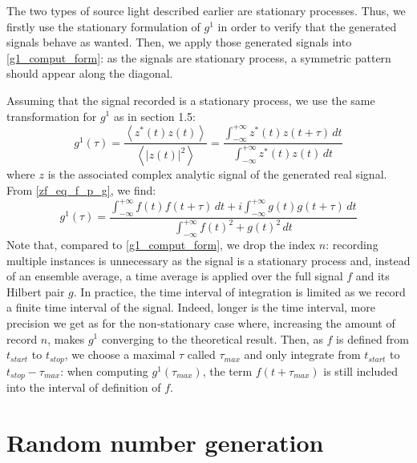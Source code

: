 \documentclass[10pt]{report}
\begin{document}
The two types of source light described earlier are stationary processes. Thus, we firstly use the stationary formulation of $g^1$ in order to verify that the generated signals behave as wanted. Then, we apply those generated signals into \eqref{g1_comput_form}: as the signals are stationary process, a symmetric pattern should appear along the diagonal.

Assuming that the signal recorded is a stationary process, we use the same transformation for $g^1$ as in section 1.5:
\begin{equation}
g^1(\tau) = \frac{\left\langle z^*(t)z(t) \right\rangle}{\left\langle \vert z(t) \vert ^2 \right\rangle} = \frac{\int_{-\infty}^{+\infty} z^*(t)z(t + \tau)\, dt}{\int_{-\infty}^{+\infty} z^*(t)z(t) \, dt}
\end{equation}
where $z$ is the associated complex analytic signal of the generated real signal. From \eqref{zf_eq_f_p_g}, we find:
\begin{equation}
\label{g1_stattionary_computer}
g^1(\tau) = \frac{\int_{-\infty}^{+\infty} f(t)f(t + \tau)\, dt  + i \int_{-\infty}^{+\infty} g(t)g(t + \tau)\, dt}{\int_{-\infty}^{+\infty} f(t)^2 + g(t)^2 \, dt}
\end{equation}
Note that, compared to \eqref{g1_comput_form}, we drop the index $n$: recording multiple instances is unnecessary as the signal is a stationary process and, instead of an ensemble average, a time average is applied over the full signal $f$ and its Hilbert pair $g$. In practice, the time interval of integration is limited as we record a finite time interval of the signal. Indeed, longer is the time interval, more precision we get as for the non-stationary case where, increasing the amount of record $n$, makes $g^1$ converging to the theoretical result. Then, as $f$ is defined from $t_{start}$ to $t_{stop}$, we choose a maximal $\tau$ called $\tau_{max}$ and only integrate from $t_{start}$ to $t_{stop} - \tau_{max}$: when computing $g^1(\tau_{max})$, the term $f(t+\tau_{max})$ is still included into the interval of definition of $f$.

\section{Random number generation}
\end{document}

